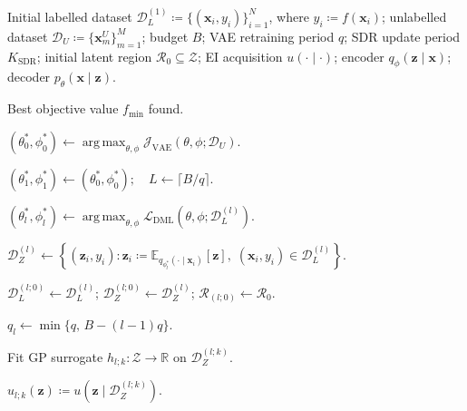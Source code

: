\documentclass[pdflatex,sn-mathphys-num]{sn-jnl}%
\theoremstyle{thmstyleone}%
\theoremstyle{thmstyletwo}%
\theoremstyle{thmstylethree}%
\begin{document}
\begin{algorithm}[h]
\caption{BO--VAE with SDR and Periodic VAE Retraining with DML}
\label{BOVAE-with-DML}
\begin{algorithmic}[1]
\small
\Require Initial labelled dataset \(\mathcal D_L^{(1)}\coloneq \{(\mathbf x_i,y_i)\}_{i=1}^{N}\), where \(y_i\coloneq f(\mathbf x_i)\); unlabelled dataset \(\mathcal D_U\coloneq\{\mathbf x_m^U\}_{m=1}^{M}\); budget \(B\); VAE retraining period \(q\); SDR update period \(K_{\mathrm{SDR}}\); initial latent region \(\mathcal R_0\subseteq\mathcal Z\); EI acquisition \(u(\cdot\mid\cdot)\); encoder \(q_\phi(\mathbf z\mid\mathbf x)\); decoder \(p_\theta(\mathbf x\mid\mathbf z)\).

\Ensure Best objective value \(f_{\min}\) found.

\State \((\theta_0^\ast,\phi_0^\ast)
\gets
\operatorname*{arg\,max}_{\theta,\phi}
\mathcal J_{\mathrm{VAE}}(\theta,\phi;\mathcal D_U)\).
\label{alg:dml-pretrain}

\State $(\theta_1^\ast,\phi_1^\ast) \gets (\theta_0^\ast,\phi_0^\ast);\quad L\gets\lceil B/q\rceil$.

\label{alg:dml-outer-start}

  \State $(\theta_l^\ast,\phi_l^\ast) \gets \operatorname*{arg\,max}_{\theta,\phi} \mathcal L_{\mathrm{DML}}(\theta,\phi;\mathcal D_L^{(l)})$.
  \label{alg:dml-retrain}

  \State $\mathcal D_Z^{(l)} \gets \left\{(\mathbf z_i,y_i): \mathbf z_i  \coloneq  \mathbb E_{q_{\phi_l^\ast}(\cdot\mid\mathbf x_i)}[\mathbf z],\; (\mathbf x_i,y_i)\in\mathcal D_L^{(l)} \right\}$.
  \label{alg:dml-encode}

  \State
  \(\mathcal D_L^{(l;0)}\gets \mathcal D_L^{(l)}\);
  \quad
  \(\mathcal D_Z^{(l;0)}\gets \mathcal D_Z^{(l)}\);
  \quad
  \(\mathcal R_{(l;0)}\gets \mathcal R_0\).

  \State $q_l\gets \min\{q,\,B-(l-1)q\}$.

  \label{alg:dml-inner-start}

    \State Fit GP surrogate \(h_{l;k}:\mathcal Z\to\mathbb R\) on
    \(\mathcal D_Z^{(l;k)}\).

    \State
    \(u_{l;k}(\mathbf z)
    \coloneq
    u(\mathbf z\mid\mathcal D_Z^{(l;k)})\).


\end{algorithmic}
\end{algorithm}
\end{document}
